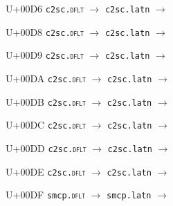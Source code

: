 \documentclass{article}
\begin{document}
\begin{substitutions}
\goodbreak

U+00D6  \linebreak
    \texttt{c2sc.\textsc{dflt}} $\to$  \linebreak
    \texttt{c2sc.latn} $\to$  

\goodbreak

U+00D8  \linebreak
    \texttt{c2sc.\textsc{dflt}} $\to$  \linebreak
    \texttt{c2sc.latn} $\to$  

\goodbreak

U+00D9  \linebreak
    \texttt{c2sc.\textsc{dflt}} $\to$  \linebreak
    \texttt{c2sc.latn} $\to$  

\goodbreak

U+00DA  \linebreak
    \texttt{c2sc.\textsc{dflt}} $\to$  \linebreak
    \texttt{c2sc.latn} $\to$  

\goodbreak

U+00DB  \linebreak
    \texttt{c2sc.\textsc{dflt}} $\to$  \linebreak
    \texttt{c2sc.latn} $\to$  

\goodbreak

U+00DC  \linebreak
    \texttt{c2sc.\textsc{dflt}} $\to$  \linebreak
    \texttt{c2sc.latn} $\to$  

\goodbreak

U+00DD  \linebreak
    \texttt{c2sc.\textsc{dflt}} $\to$  \linebreak
    \texttt{c2sc.latn} $\to$  

\goodbreak

U+00DE  \linebreak
    \texttt{c2sc.\textsc{dflt}} $\to$  \linebreak
    \texttt{c2sc.latn} $\to$  

\goodbreak

U+00DF  \linebreak
    \texttt{smcp.\textsc{dflt}} $\to$  \linebreak
    \texttt{smcp.latn} $\to$  


\end{substitutions}
\end{document}
